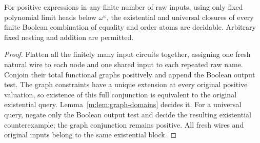 \begin{corollary}
\label{m:cor:polynomial-booleans}
For positive expressions in any finite number of raw inputs, using only
fixed polynomial limit heads below $\omega^\omega$, the existential
and universal closures of every finite Boolean combination of equality
and order atoms are decidable.  Arbitrary fixed nesting and addition
are permitted.
\end{corollary}
\begin{proof}
Flatten all the finitely many input circuits together, assigning one
fresh natural wire to each node and one shared input to each repeated
raw name.  Conjoin their total functional graphs positively and append
the Boolean output test.  The graph constraints have a unique extension
at every original positive valuation, so existence of this full
conjunction is equivalent to the original existential query.
Lemma~\ref{m:lem:graph-domains} decides it.  For a universal query,
negate only the Boolean output test and decide the resulting existential
counterexample; the graph conjunction remains positive.  All fresh
wires and original inputs belong to the same existential block.
\end{proof}

